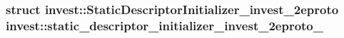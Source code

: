 \subsubsection[{static\+\_\+descriptor\+\_\+initializer\+\_\+invest\+\_\+2eproto\+\_\+}]{\setlength{\rightskip}{0pt plus 5cm}struct {\bf invest\+::\+Static\+Descriptor\+Initializer\+\_\+invest\+\_\+2eproto}  invest\+::static\+\_\+descriptor\+\_\+initializer\+\_\+invest\+\_\+2eproto\+\_\+}\label{namespaceinvest_aead490f575ec94fd746c85216615948d}
